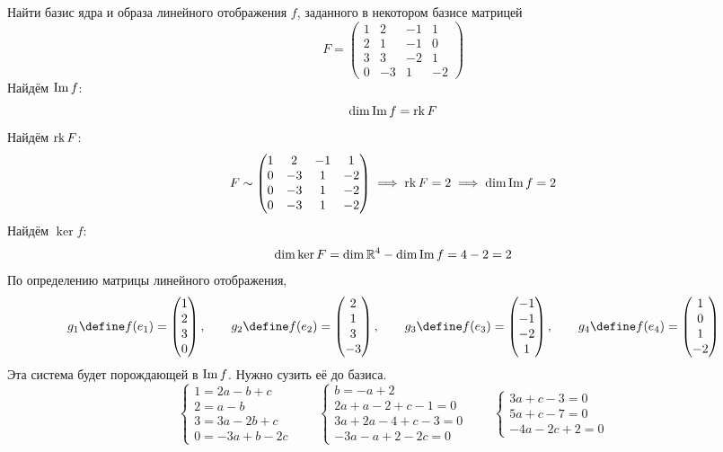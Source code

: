Найти базис ядра и образа линейного отображения $ f $, заданного в некотором базисе матрицей
$$ F =
\begin{pmatrix}
	1 & 2 & -1 & 1 \\
    2 & 1 & -1 & 0 \\
    3 & 3 & -2 & 1 \\
    0 & -3 & 1 & -2
\end{pmatrix} $$
Найдём $ \operatorname{Im} f $:
$$ \dim \operatorname{Im} f = \operatorname{rk} F $$
Найдём $ \operatorname{rk} F $:
$$ F \sim
\begin{pmatrix}
	1 & 2 & -1 & 1 \\
    0 & -3 & 1 & -2 \\
    0 & -3 & 1 & -2 \\
    0 & -3 & 1 & -2
\end{pmatrix} \implies \operatorname{rk} F = 2 \implies \dim \operatorname{Im} f = 2 $$
Найдём $ \ker f $:
$$ \dim \ker F = \dim \mathbb{R}^4 - \dim \operatorname{Im} f = 4 - 2 = 2 $$
По определению матрицы линейного отображения,
$$ g_1 \define f(e_1) =
\begin{pmatrix}
	1 \\
    2 \\
    3 \\
    0
\end{pmatrix}, \qquad g_2 \define f(e_2) =
\begin{pmatrix}
	2 \\
    1 \\
    3 \\
    -3
\end{pmatrix}, \qquad g_3 \define f(e_3) =
\begin{pmatrix}
	-1 \\
    -1 \\
    -2 \\
    1
\end{pmatrix}, \qquad g_4 \define f(e_4) =
\begin{pmatrix}
    1 \\
    0 \\
    1 \\
    -2
\end{pmatrix} $$
Эта система будет порождающей в $ \operatorname{Im} f $. Нужно сузить её до базиса.
$$
\begin{cases}
	1 = 2a - b + c \\
    2 = a - b \\
    3 = 3a - 2b + c \\
    0 = -3a + b - 2c
\end{cases} \qquad
\begin{cases}
	b = -a + 2 \\
    2a + a - 2 + c - 1 = 0 \\
    3a + 2a - 4 + c - 3 = 0 \\
    -3a - a + 2 - 2c = 0
\end{cases} \qquad
\begin{cases}
	3a + c - 3 = 0 \\
    5a + c - 7 = 0 \\
    -4a - 2c + 2 = 0
\end{cases} $$
